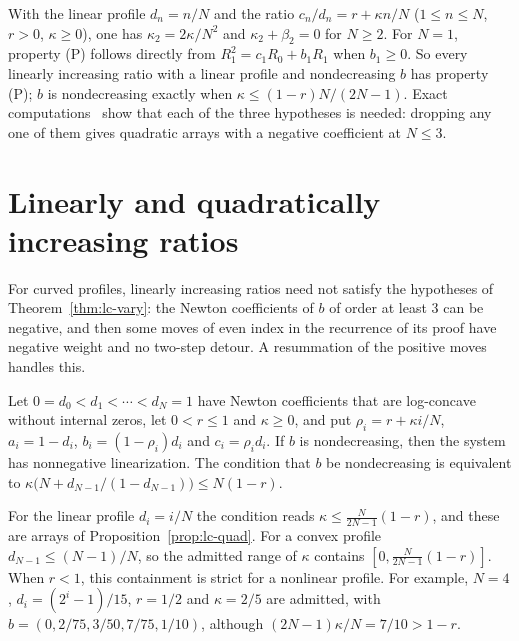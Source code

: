 With the linear profile $d_n=n/N$ and the ratio $c_n/d_n=r+\kappa n/N$ ($1\leq n\leq N$, $r>0$, $\kappa\geq0$), one has $\kappa_2=2\kappa/N^2$ and $\kappa_2+\beta_2=0$ for $N\geq2$. For $N=1$, property (P) follows directly from $R_1^2=c_1R_0+b_1R_1$ when $b_1\geq0$. So every linearly increasing ratio with a linear profile and nondecreasing $b$ has property (P); $b$ is nondecreasing exactly when $\kappa\leq(1-r)N/(2N-1)$. Exact computations~\cite{code} show that each of the three hypotheses is needed: dropping any one of them gives quadratic arrays with a negative coefficient at $N\leq3$.

\section{Linearly and quadratically increasing ratios}\label{sec:affine}
For curved profiles, linearly increasing ratios need not satisfy the hypotheses of Theorem~\ref{thm:lc-vary}: the Newton coefficients of $b$ of order at least $3$ can be negative, and then some moves of even index in the recurrence of its proof have negative weight and no two-step detour. A resummation of the positive moves handles this.

\begin{theorem}\label{thm:lc-affine}
Let $0=d_0<d_1<\cdots<d_N=1$ have Newton coefficients that are log-concave without internal zeros, let $0<r\leq1$ and $\kappa\geq0$, and put $\rho_i=r+\kappa i/N$, $a_i=1-d_i$, $b_i=(1-\rho_i)d_i$ and $c_i=\rho_id_i$. If $b$ is nondecreasing, then the system has nonnegative linearization. The condition that $b$ be nondecreasing is equivalent to $\kappa\bigl(N+d_{N-1}/(1-d_{N-1})\bigr)\leq N(1-r)$.
\end{theorem}

For the linear profile $d_i=i/N$ the condition reads $\kappa\leq\frac N{2N-1}(1-r)$, and these are arrays of Proposition~\ref{prop:lc-quad}. For a convex profile $d_{N-1}\leq(N-1)/N$, so the admitted range of $\kappa$ contains $[0,\frac N{2N-1}(1-r)]$. When $r<1$, this containment is strict for a nonlinear profile. For example, $N=4$, $d_i=(2^i-1)/15$, $r=1/2$ and $\kappa=2/5$ are admitted, with $b=(0,2/75,3/50,7/75,1/10)$, although $(2N-1)\kappa/N=7/10>1-r$.

